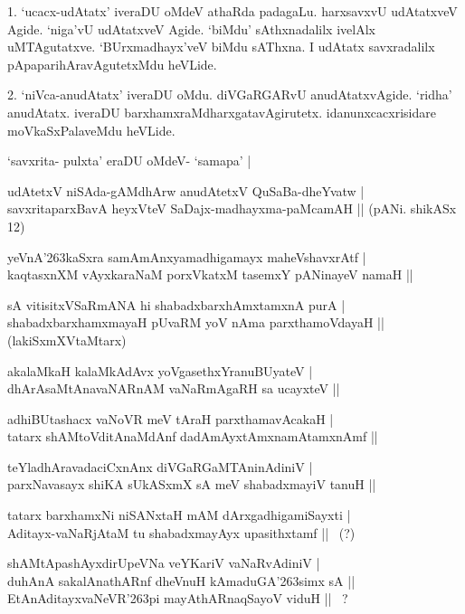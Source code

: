 \begin{artha}
1. `ucacx-udAtatx' iveraDU oMdeV athaRda padagaLu. harxsavxvU udAtatxveV Agide. `niga'vU udAtatxveV Agide. `biMdu' sAthxnadalilx ivelAlx uMTAgutatxve. `BUrxmadhayx'veV biMdu sAThxna. I udAtatx savxradalilx pApaparihAravAgutetxMdu heVLide.
\end{artha}

\begin{artha}
2. `niVca-anudAtatx' iveraDU oMdu. diVGaRGARvU anudAtatxvAgide. `ridha' anudAtatx. iveraDU barxhamxraMdharxgatavAgirutetx. idanunxcacxrisidare moVkaSxPalaveMdu heVLide.
\end{artha}

\begin{itemize}
{\bf 
 \item[3.] `savxrita- pulxta' eraDU oMdeV- `samapa' |
 \item[4.] udAtetxV niSAda-gAMdhArw anudAtetxV QuSaBa-dheYvatw |\\\label{156d}
 savxritaparxBavA heyxVteV SaDajx-madhayxma-paMcamAH ||
 \hfill{(pANi. shikASx 12)}
 \item[5.] yeVnA\char'263kaSxra samAmAnxyamadhigamayx maheVshavxrAtf |\\\label{157}
 kaqtasxnXM vAyxkaraNaM porxVkatxM tasemxY pANinayeV namaH ||
 \item[6.] sA vitisitxVSaRmANA hi shabadxbarxhAmxtamxnA purA |\\\label{157a}
 shabadxbarxhamxmayaH pUvaRM yoV nAma parxthamoVdayaH ||\hfill{(lakiSxmXVtaMtarx)}
 \item[7.] akalaMkaH kalaMkAdAvx yoVgasethxYranuBUyateV |\\\label{157b}
 dhArAsaMtAnavaNARnAM vaNaRmAgaRH sa ucayxteV ||
 \item[8.] adhiBUtashacx vaNoVR meV tAraH parxthamavAcakaH |\\\label{157c}
 tatarx shAMtoVditAnaMdAnf dadAmAyxtAmxnamAtamxnAmf ||
 \item[9.] teYladhAravadaciCxnAnx diVGaRGaMTAninAdiniV |\\
 parxNavasayx shiKA sUkASxmX sA meV shabadxmayiV tanuH ||
 \item[10.] tatarx barxhamxNi niSANxtaH mAM dArxgadhigamiSayxti |\\
 Aditayx-vaNaRjAtaM tu shabadxmayAyx upasithxtamf || ~(?)
 \item[11.] shAMtApashAyxdirUpeVNa veYKariV vaNaRvAdiniV |\\
 duhAnA sakalAnathARnf dheVnuH kAmaduGA\char'263simx sA ||\\
 EtAnAditayxvaNeVR\char'263pi mayAthARnaqSayoV viduH || ~?}
\end{itemize}

